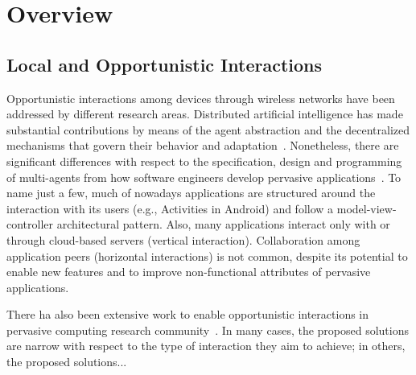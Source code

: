 \section{Overview}\label{sec:overview}

\subsection{Local and Opportunistic Interactions}

Opportunistic interactions among devices through wireless networks have been addressed by different research areas. Distributed artificial intelligence has made substantial contributions by means of the agent abstraction and the decentralized mechanisms that govern their behavior and adaptation~\cite{}. Nonetheless, there are significant differences with respect to the specification, design and programming of multi-agents from how software engineers develop pervasive applications~\cite{}. To name just a few, much of nowadays applications are structured around the interaction with its users (e.g., Activities in Android) and follow a model-view-controller architectural pattern. Also, many applications interact only with or through cloud-based servers (vertical interaction). Collaboration among application peers (horizontal interactions) is not common, despite its potential to enable new features and to improve non-functional attributes of pervasive applications.

There ha also been extensive work to enable opportunistic interactions in pervasive computing research community~\cite{}. In many cases, the proposed solutions are narrow with respect to the type of interaction they aim to achieve; in others, the proposed solutions... %


